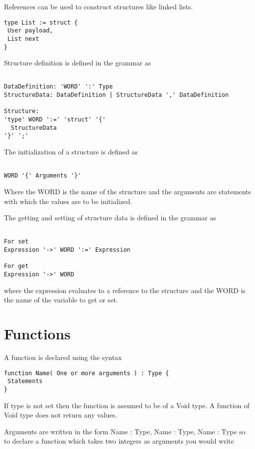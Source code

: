 \documentclass[]{final_report}
\begin{document}
References can be used to construct structures like linked lists.

\begin{verbatim}
type List := struct {
 User payload,
 List next
}
\end{verbatim}

Structure definition is defined in the grammar as
\begin{verbatim}

DataDefinition: 'WORD' ':' Type
StructureData: DataDefinition | StructureData ',' DataDefinition

Structure:
'type' WORD ':=' 'struct' '{'
  StructureData
'}' ';'

\end{verbatim}

The initialization of a structure is defined as

\begin{verbatim}

WORD '{' Arguments '}'

\end{verbatim}

Where the WORD is the name of the structure and the arguments are statements with which the values are to be initialized.

The getting and setting of structure data is defined in the grammar as 
\begin{verbatim}

For set
Expression '->' WORD ':=' Expression

For get
Expression '->' WORD

\end{verbatim}

where the expression evaluates to a reference to the structure and the WORD is the name of the variable to get or set.

\section{Functions}

A function is declared using the syntax

\begin{verbatim}
function Name( One or more arguments ) : Type {
 Statements
}
\end{verbatim}

If type is not set then the function is assumed to be of a Void type. A function of Void type does not return any values.

Arguments are written in the form Name : Type, Name : Type, Name : Type so to declare a function which takes two integers as arguments you would write
\end{document}
